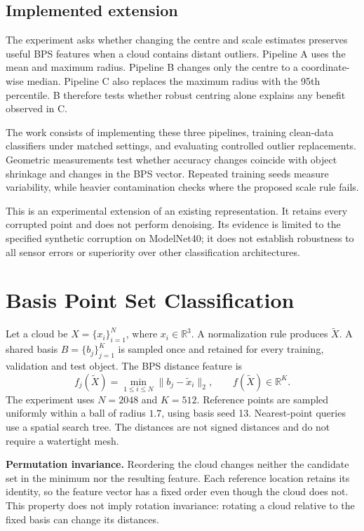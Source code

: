 \documentclass[11pt,a4paper]{article}
\newcommand{\R}{\mathbb{R}}
\begin{document}
\subsection{Implemented extension}
The experiment asks whether changing the centre and scale estimates preserves useful BPS features when a cloud contains distant outliers. Pipeline A uses the mean and maximum radius. Pipeline B changes only the centre to a coordinate-wise median. Pipeline C also replaces the maximum radius with the 95th percentile. B therefore tests whether robust centring alone explains any benefit observed in C.

The work consists of implementing these three pipelines, training clean-data classifiers under matched settings, and evaluating controlled outlier replacements. Geometric measurements test whether accuracy changes coincide with object shrinkage and changes in the BPS vector. Repeated training seeds measure variability, while heavier contamination checks where the proposed scale rule fails.

This is an experimental extension of an existing representation. It retains every corrupted point and does not perform denoising. Its evidence is limited to the specified synthetic corruption on ModelNet40; it does not establish robustness to all sensor errors or superiority over other classification architectures.
\clearpage

\section{Basis Point Set Classification}
Let a cloud be $X=\{x_i\}_{i=1}^{N}$, where $x_i\in\R^3$. A normalization rule produces $\widetilde X$. A shared basis $B=\{b_j\}_{j=1}^{K}$ is sampled once and retained for every training, validation and test object. The BPS distance feature is
\begin{equation}
 f_j(\widetilde X)=\min_{1\leq i\leq N}\|b_j-\widetilde x_i\|_2,
 \qquad f(\widetilde X)\in\R^K.
\end{equation}
The experiment uses $N=2048$ and $K=512$. Reference points are sampled uniformly within a ball of radius $1.7$, using basis seed 13. Nearest-point queries use a spatial search tree. The distances are not signed distances and do not require a watertight mesh.

\textbf{Permutation invariance.} Reordering the cloud changes neither the candidate set in the minimum nor the resulting feature. Each reference location retains its identity, so the feature vector has a fixed order even though the cloud does not. This property does not imply rotation invariance: rotating a cloud relative to the fixed basis can change its distances.
\end{document}
